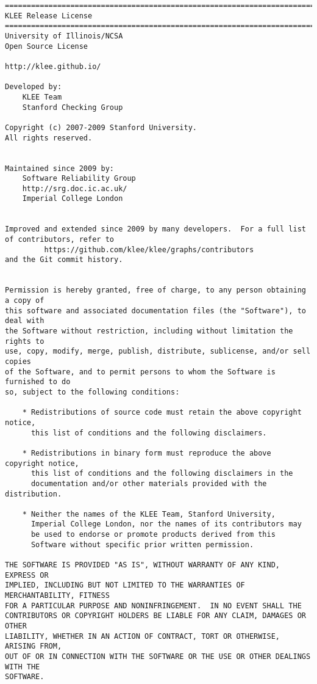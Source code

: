 \begin{lstlisting}[language={}]
==============================================================================
KLEE Release License
==============================================================================
University of Illinois/NCSA
Open Source License

http://klee.github.io/

Developed by:
    KLEE Team
    Stanford Checking Group

Copyright (c) 2007-2009 Stanford University.
All rights reserved.


Maintained since 2009 by:
    Software Reliability Group
    http://srg.doc.ic.ac.uk/
    Imperial College London


Improved and extended since 2009 by many developers.  For a full list
of contributors, refer to
         https://github.com/klee/klee/graphs/contributors
and the Git commit history.


Permission is hereby granted, free of charge, to any person obtaining a copy of
this software and associated documentation files (the "Software"), to deal with
the Software without restriction, including without limitation the rights to
use, copy, modify, merge, publish, distribute, sublicense, and/or sell copies
of the Software, and to permit persons to whom the Software is furnished to do
so, subject to the following conditions:

    * Redistributions of source code must retain the above copyright notice,
      this list of conditions and the following disclaimers.

    * Redistributions in binary form must reproduce the above copyright notice,
      this list of conditions and the following disclaimers in the
      documentation and/or other materials provided with the distribution.

    * Neither the names of the KLEE Team, Stanford University,
      Imperial College London, nor the names of its contributors may
      be used to endorse or promote products derived from this
      Software without specific prior written permission.

THE SOFTWARE IS PROVIDED "AS IS", WITHOUT WARRANTY OF ANY KIND, EXPRESS OR
IMPLIED, INCLUDING BUT NOT LIMITED TO THE WARRANTIES OF MERCHANTABILITY, FITNESS
FOR A PARTICULAR PURPOSE AND NONINFRINGEMENT.  IN NO EVENT SHALL THE
CONTRIBUTORS OR COPYRIGHT HOLDERS BE LIABLE FOR ANY CLAIM, DAMAGES OR OTHER
LIABILITY, WHETHER IN AN ACTION OF CONTRACT, TORT OR OTHERWISE, ARISING FROM,
OUT OF OR IN CONNECTION WITH THE SOFTWARE OR THE USE OR OTHER DEALINGS WITH THE
SOFTWARE.


\end{lstlisting}

